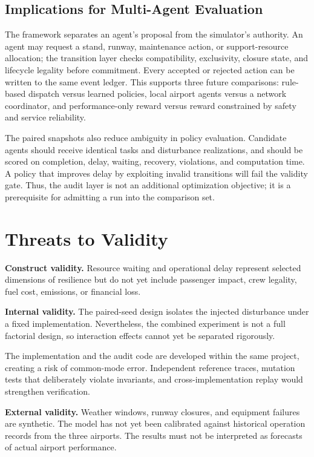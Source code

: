 \documentclass[runningheads]{llncs}
\begin{document}
\subsection{Implications for Multi-Agent Evaluation}
The framework separates an agent's proposal from the simulator's authority. An agent may request a stand, runway, maintenance action, or support-resource allocation; the transition layer checks compatibility, exclusivity, closure state, and lifecycle legality before commitment. Every accepted or rejected action can be written to the same event ledger. This supports three future comparisons: rule-based dispatch versus learned policies, local airport agents versus a network coordinator, and performance-only reward versus reward constrained by safety and service reliability.

The paired snapshots also reduce ambiguity in policy evaluation. Candidate agents should receive identical tasks and disturbance realizations, and should be scored on completion, delay, waiting, recovery, violations, and computation time. A policy that improves delay by exploiting invalid transitions will fail the validity gate. Thus, the audit layer is not an additional optimization objective; it is a prerequisite for admitting a run into the comparison set.

\section{Threats to Validity}
\textbf{Construct validity.} Resource waiting and operational delay represent selected dimensions of resilience but do not yet include passenger impact, crew legality, fuel cost, emissions, or financial loss.

\textbf{Internal validity.} The paired-seed design isolates the injected disturbance under a fixed implementation. Nevertheless, the combined experiment is not a full factorial design, so interaction effects cannot yet be separated rigorously.

The implementation and the audit code are developed within the same project, creating a risk of common-mode error. Independent reference traces, mutation tests that deliberately violate invariants, and cross-implementation replay would strengthen verification.

\textbf{External validity.} Weather windows, runway closures, and equipment failures are synthetic. The model has not yet been calibrated against historical operation records from the three airports. The results must not be interpreted as forecasts of actual airport performance.
\end{document}
